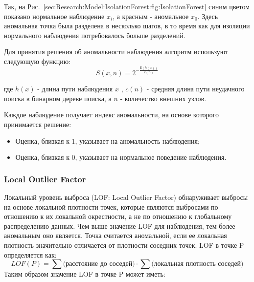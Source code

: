 \documentclass[12pt]{article}
\begin{document}
    \par Так, на Рис.~\ref{sec:Research:Model:IsolationForest:fig:IsolationForest} синим цветом показано нормальное наблюдение $x_i$, а красным - аномальное $x_0$. Здесь аномальная точка была разделена в несколько шагов, в то время как для изоляции нормального наблюдения потребовалось больше разделений.

    \par Для принятия решения об аномальности наблюдения алгоритм используют следующую функцию:
    \begin{equation}
    \label{sec:Research:Model:IsolationForest:formula:IF}
        S(x,n) = 2^{-\frac{\mathsf{E}(h(x))}{c(n)}}
    \end{equation}

    \noindent где $h(x)$ - длина пути наблюдения $x$ , $c(n)$ - средняя длина пути неудачного поиска в бинарном дереве поиска, а $n$ - количество внешних узлов.

    \par Каждое наблюдение получает индекс аномальности, на основе которого принимается решение:
    \begin{itemize}
        \item Оценка, близкая к 1, указывает на аномальность наблюдения;
        \item Оценка, близкая к 0, указывает на нормальное поведение наблюдения.
    \end{itemize}


    \subsubsection{Local Outlier Factor}
    \label{sec:Research:Model:LocalOutlierFactor}

    Локальный уровень выброса (LOF: Local Outlier Factor) обнаруживает выбросы на основе локальной плотности точек, которые являются выбросами по отношению к их локальной окрестности, а не по отношению к глобальному распределению данных. Чем выше значение LOF для наблюдения, тем более аномальным оно является. Точка считается аномальной, если ее локальная плотность значительно отличается от плотности соседних точек. LOF в точке P определяется как:
    $$
    LOF(P) = \sum \text{(расстояние до соседей)} \cdot \sum \text{(локальная плотность соседей)}
    $$
    Таким образом значение LOF в точке P может иметь:
\end{document}
